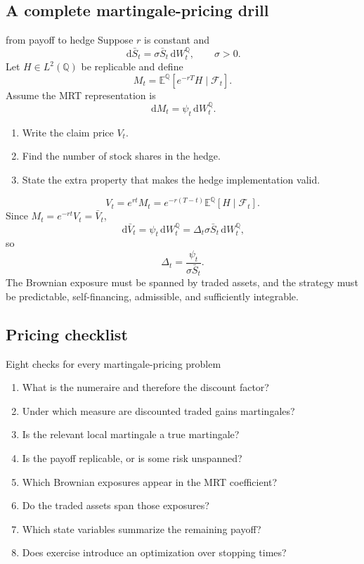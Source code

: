 \documentclass[10pt]{article}
\newcommand{\E}{\mathbb E}
\newcommand{\Q}{\mathbb Q}
\newcommand{\1}{\mathbf 1}
\newcommand{\cF}{\mathcal F}
\newcommand{\dd}{\,\mathrm d}
\theoremstyle{definition}
\begin{document}
\subsection{A complete martingale-pricing drill}

\begin{studentexercise}{from payoff to hedge}
Suppose \(r\) is constant and
\[
\dd\bar S_t=\sigma\bar S_t\dd W_t^\Q,\qquad \sigma>0.
\]
Let \(H\in L^2(\Q)\) be replicable and define
\[
M_t=\E^\Q[e^{-rT}H\mid\cF_t].
\]
Assume the MRT representation is
\[
\dd M_t=\psi_t\dd W_t^\Q.
\]
\begin{enumerate}
  \item Write the claim price \(V_t\).
  \item Find the number of stock shares in the hedge.
  \item State the extra property that makes the hedge implementation valid.
\end{enumerate}
\end{studentexercise}
\begin{shortsolution}
\[
\boxed{
V_t=e^{rt}M_t
=e^{-r(T-t)}\E^\Q[H\mid\cF_t].}
\]
Since \(M_t=e^{-rt}V_t=\bar V_t\),
\[
\dd\bar V_t=\psi_t\dd W_t^\Q
=\Delta_t\sigma\bar S_t\dd W_t^\Q,
\]
so
\[
\boxed{\Delta_t=\frac{\psi_t}{\sigma\bar S_t}.}
\]
The Brownian exposure must be spanned by traded assets, and the strategy must
be predictable, self-financing, admissible, and sufficiently integrable.
\end{shortsolution}

\subsection{Pricing checklist}

\begin{keyidea}{Eight checks for every martingale-pricing problem}
\begin{enumerate}
  \item What is the numeraire and therefore the discount factor?
  \item Under which measure are discounted traded gains martingales?
  \item Is the relevant local martingale a true martingale?
  \item Is the payoff replicable, or is some risk unspanned?
  \item Which Brownian exposures appear in the MRT coefficient?
  \item Do the traded assets span those exposures?
  \item Which state variables summarize the remaining payoff?
  \item Does exercise introduce an optimization over stopping times?
\end{enumerate}
\end{keyidea}
\end{document}

